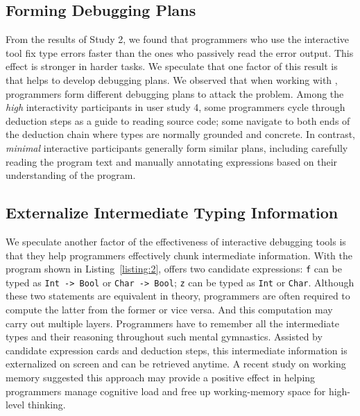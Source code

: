 \subsection{Forming Debugging Plans}
From the results of Study 2, we found that programmers who use the interactive tool fix type errors faster than the ones who passively read the error output. This effect is stronger in harder tasks. We speculate that one factor of this result is that  \chameleon{} helps to develop debugging plans. We observed that when working with \chameleon{}, programmers form different debugging plans to attack the problem. Among the \textit{high} interactivity participants in user study 4, some programmers cycle through deduction steps as a guide to reading source code; some navigate to both ends of the deduction chain where types are normally grounded and concrete. In contrast, \textit{minimal} interactive participants generally form similar plans, including carefully reading the program text and manually annotating expressions based on their understanding of the program.


\subsection{Externalize Intermediate Typing Information}
We speculate another factor of the effectiveness of \chameleon{} interactive debugging tools is that they help programmers effectively chunk intermediate information. With the program shown in Listing~\ref{listing:2}, \chameleon{} offers two candidate expressions: \texttt{f} can be typed as \texttt{Int -> Bool} or \texttt{Char -> Bool}; \texttt{z} can be typed as \texttt{Int} or \texttt{Char}. Although  these two statements are equivalent in theory, programmers are often required to compute the latter from the former or vice versa. And this computation may carry out multiple layers. Programmers have to remember all the intermediate types and their reasoning throughout such mental gymnastics. Assisted by candidate expression cards and deduction steps, this intermediate information is externalized on screen and can be retrieved anytime. A recent study on working memory \cite{crichton_role_2021} suggested this approach may provide a positive effect in helping programmers manage cognitive load and free up working-memory space for high-level thinking.


